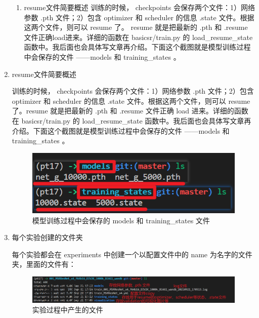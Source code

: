 \documentclass[../main.tex]{subfiles}
\begin{document}
\begin{enumerate}
\begin{enumerate}
\item resume文件简要概述
训练的时候， checkpoints 会保存两个文件：1）网络参数 .pth 文件；2）包含 optimizer 和 scheduler 的信息 .state 文件。根据这两个文件，则可以 resume 了。 resume 就是把最新的 .pth 和 .resume 文件正确load进来。详细的函数在 basicsr/train.py 的 load\_resume\_state 函数中。我后面也会具体写文章再介绍。下面这个截图就是模型训练过程中会保存的文件 ——models 和 training\_states 。

\end{enumerate}

\item resume文件简要概述

训练的时候， checkpoints 会保存两个文件：1）网络参数 .pth 文件；2）包含 optimizer 和 scheduler 的信息 .state 文件。根据这两个文件，则可以 resume 了。resume 就是把最新的 .pth 和 .resume 文件正确 load 进来。详细的函数在 basicsr/train.py 的 load\_resume\_state 函数中。我后面也会具体写文章再介绍。下面这个截图就是模型训练过程中会保存的文件 ——models 和 training\_states 。

\begin{figure}[H]
\begin{center}
    \includegraphics[width=0.7\linewidth]{figures/getting_start_4.png}
    \caption{模型训练过程中会保存的 models 和 training\_states 文件}
    \label{fig:getting_start_4}
\end{center}
\vspace{-0.5cm}
\end{figure}

\item 每个实验创建的文件夹

每个实验都会在 experiments 中创建一个以配置文件中的 name 为名字的文件夹，里面的文件有：

\begin{figure}[H]
\begin{center}
    \includegraphics[width=0.7\linewidth]{figures/getting_start_5.png}
    \caption{实验过程中产生的文件}
    \label{fig:getting_start_5}
\end{center}
\vspace{-0.5cm}
\end{figure}


\end{enumerate}
\end{document}
